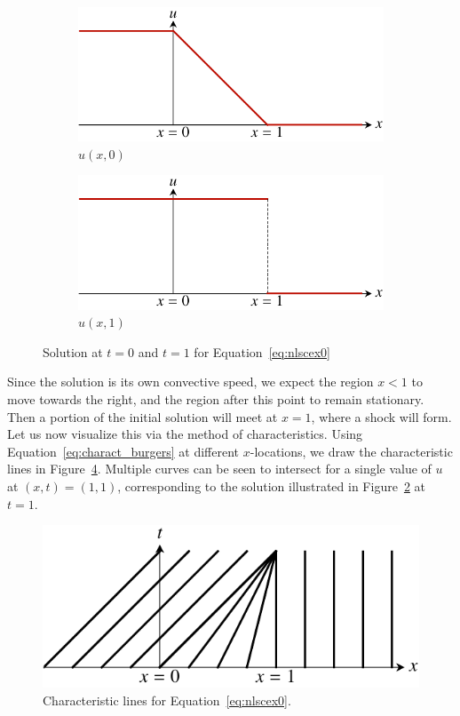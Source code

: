 \begin{figure}[htbp]
	\centering
	\begin{subfigure}[b]{0.49\linewidth}
	\includegraphics[width=\linewidth]{Pictures/nonlinear_scalar_example_u0}
	\caption{$u(x,0)$}
	\label{fig:nslcexa}
	\end{subfigure}
	\begin{subfigure}[b]{0.49\linewidth}
		\includegraphics[width=\linewidth]{Pictures/nonlinear_scalar_example_uf}
		\caption{$u(x,1)$}
	\label{fig:nslcexb}
	\end{subfigure}
	\caption{Solution at $t=0$ and $t=1$ for Equation~\ref{eq:nlscex0}}
	\label{fig:nslcex}
\end{figure}

Since the solution is its own convective speed, we expect the region $x<1$ to move towards the right, and the region after this point to remain stationary. Then a portion of the initial solution will meet at $x=1$, where a shock will form. Let us now visualize this via the method of characteristics. Using Equation~\ref{eq:charact_burgers} at different $x$-locations, we draw the characteristic lines in Figure~\ref{fig:nlscchar}. Multiple curves can be seen to intersect for a single value of $u$ at $(x,t) = (1,1)$, corresponding to the solution illustrated in Figure~\ref{fig:nslcexb} at $t=1$. 
\begin{figure}[htbp]
	\centering
	\includegraphics[width=0.45\linewidth]{Pictures/nonlinear_scalar_characteristics}
	\caption{Characteristic lines for Equation~\ref{eq:nlscex0}.}
	\label{fig:nlscchar}
\end{figure}

